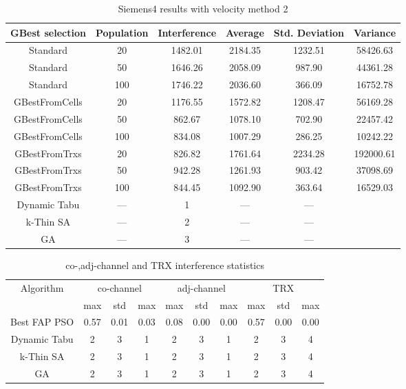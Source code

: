 \begin{table}[H]
\centering
	\begin{tabular}{cccccc}
	\toprule
    GBest selection & Population & Interference & Average & Std. Deviation & Variance \\
    \midrule
    Standard & 20 & 1482.01 & 2184.35 & 1232.51 & 58426.63\\
    Standard & 50 & 1646.26 & 2058.09 & 987.90 & 44361.28\\
    Standard & 100 & 1746.22 & 2036.60 & 366.09 & 16752.78\\
    GBestFromCells & 20 & 1176.55 & 1572.82 & 1208.47 & 56169.28\\
    GBestFromCells & 50 & 862.67 & 1078.10 & 702.90 & 22457.42\\
    GBestFromCells & 100 & 834.08 & 1007.29 & 286.25 & 10242.22\\
    GBestFromTrxs & 20 & 826.82 & 1761.64 & 2234.28 & 192000.61\\
    GBestFromTrxs & 50 & 942.28 & 1261.93 & 903.42 & 37098.69\\
    GBestFromTrxs & 100 & 844.45 & 1092.90 & 363.64 & 16529.03\\
    \midrule
    Dynamic Tabu & --- & 1 & --- & --- \\
    k-Thin SA & --- & 2 & --- & --- \\
    GA & --- & 3 & --- & --- \\
    \bottomrule
	\end{tabular}
\caption{Siemens4 results with velocity method 2}
\label{tab:siem4m2}
\end{table}
\begin{table}[H]
\centering
	\begin{tabular}{cccccccccc}
	\toprule
    Algorithm & \multicolumn{3}{c}{co-channel} & \multicolumn{3}{c}{adj-channel} & \multicolumn{3}{c}{TRX}\\
              & max & std & max
              & max & std & max
              & max & std & max\\
    \midrule
    Best FAP PSO & 0.57 & 0.01 & 0.03 & 0.08 & 0.00 & 0.00 & 0.57 & 0.00 & 0.00\\
    Dynamic Tabu & 2 & 3 & 1 & 2 & 3 & 1 & 2 & 3 & 4\\\hline
    k-Thin SA & 2 & 3 & 1 & 2 & 3 & 1 & 2 & 3 & 4\\\hline
    GA & 2 & 3 & 1 & 2 & 3 & 1 & 2 & 3 & 4\\\hline
    \bottomrule
	\end{tabular}
\caption{co-,adj-channel and TRX interference statistics}
\label{tab:stats-siem4m1}
\end{table}
